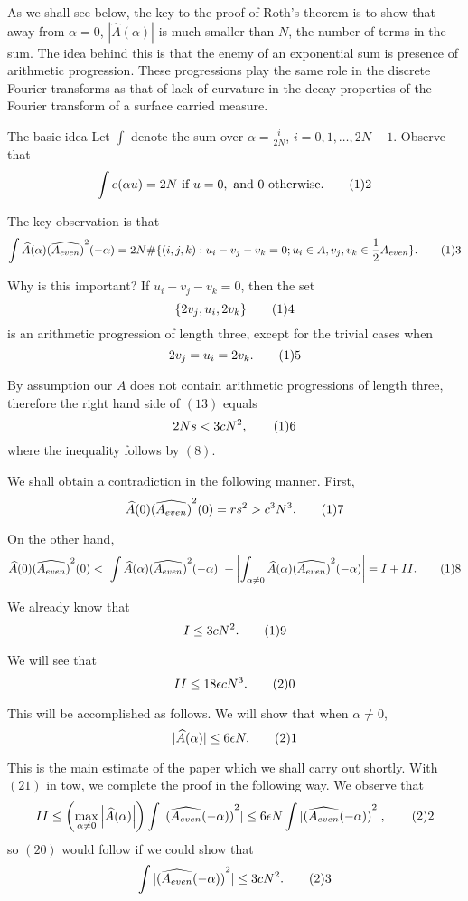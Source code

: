 As we shall see below, the key to the proof of Roth's theorem is
to show that away from $\alpha=0$, $|\widehat{A}(\alpha)|$ is much
smaller than $N$, the number of terms in the sum. The idea behind
this is that the enemy of an exponential sum is presence of
arithmetic progression. These progressions play the same role in
the discrete Fourier transforms as that of lack of curvature in
the decay properties of the Fourier transform of a surface carried
measure.

\subhead The basic idea \endsubhead Let $\int$ denote the sum over
$\alpha=\frac{i}{2N}$, $i=0,1, \dots, 2N-1$. Observe that
$$ \int e(\alpha u)=2N \ \text{if} \ u=0, \ \text{and} \ 0 \
\text{otherwise}. \tag12$$

The key observation is that
$$ \int \widehat{A}(\alpha) {(\widehat{A_{even}})}^2(-\alpha)=2N \# \{(i,j,k):
u_i-v_j-v_k=0; u_i \in A, v_j, v_k \in \frac{1}{2}A_{even} \}.
\tag13$$

Why is this important? If $u_i-v_j-v_k=0$, then the set
$$ \{2v_j, u_i, 2v_k\} \tag14$$ is an arithmetic progression of
length three, except for the trivial cases when
$$ 2v_j=u_i=2v_k. \tag15$$

By assumption our $A$ does not contain arithmetic progressions of
length three, therefore the right hand side of $(13)$ equals
$$2Ns<3cN^2, \tag16$$ where the inequality follows by $(8)$.

We shall obtain a contradiction in the following manner. First,
$$ \widehat{A}(0) {(\widehat{A_{even}})}^2(0)=rs^2>c^3N^3.
\tag17$$

On the other hand,
$$ \widehat{A}(0) {(\widehat{A_{even}})}^2(0)<\left|\int
\widehat{A}(\alpha)
{(\widehat{A_{even}})}^2(-\alpha)\right|+\left|\int_{\alpha
\not=0} \widehat{A}(\alpha)
{(\widehat{A_{even}})}^2(-\alpha)\right|=I+II. \tag18$$

We already know that
$$ I \leq 3cN^2. \tag19$$

We will see that
$$ II \leq 18 \epsilon c N^3. \tag20$$

This will be accomplished as follows. We will show that when
$\alpha \not=0$,
$$ |\widehat{A}(\alpha)| \leq 6 \epsilon N. \tag21$$

This is the main estimate of the paper which we shall carry out
shortly. With $(21)$ in tow, we complete the proof in the
following way. We observe that
$$ II \leq \left( \max_{\alpha \not=0} \left|
\widehat{A}(\alpha)\right| \right) \int
|{(\widehat{A_{even}}(-\alpha))}^2| \leq 6 \epsilon N \int
|{(\widehat{A_{even}}(-\alpha))}^2|, \tag22$$ so $(20)$ would
follow if we could show that
$$ \int |{(\widehat{A_{even}}(-\alpha))}^2| \leq 3cN^2. \tag23$$

